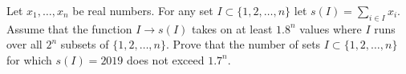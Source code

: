Let $x_1,\ldots,x_n$ be real numbers. For any set $I\subset\{1,2,…,n\}$ let $s(I)=\sum_{i\in I}x_i$. Assume that the function $I\to s(I)$ takes on at least $1.8^n$ values where $I$ runs over all $2^n$ subsets of $\{1,2,…,n\}$. Prove that the number of sets $I\subset \{1,2,…,n\}$ for which $s(I)=2019$ does not exceed $1.7^n$.

